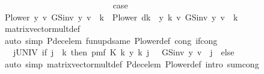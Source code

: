\begin{isabellebody}
\ \ \ \ \ \ \isamarkupfalse%
\isanewline
\ \ \ \ \ \ \ \ \isamarkupfalse%
\ {}\isanewline
\ \ \ \ \ \ \ \ \isamarkupfalse%
\ {\isacharquery}{\kern0pt}case\ \isanewline
\ \ \ \ \ \ \ \ \isamarkupfalse%
\ {\isacharminus}{\kern0pt}\isanewline
\ \ \ \ \ \ \ \ \ \ \isamarkupfalse%
\ {\isachardoublequoteopen}{\isacharparenleft}{\kern0pt}P{\isacharunderscore}{\kern0pt}lower\ y\ {\isacharasterisk}{\kern0pt}v\ GS{\isacharunderscore}{\kern0pt}inv\ y\ v{\isacharparenright}{\kern0pt}\ {\isachardollar}{\kern0pt}\ k\ {\isacharequal}{\kern0pt}\ {\isacharparenleft}{\kern0pt}P{\isacharunderscore}{\kern0pt}lower\ {\isacharparenleft}{\kern0pt}d{\isacharparenleft}{\kern0pt}k\ {\isacharcolon}{\kern0pt}{\isacharequal}{\kern0pt}\ y\ k{\isacharparenright}{\kern0pt}{\isacharparenright}{\kern0pt}\ {\isacharasterisk}{\kern0pt}v\ GS{\isacharunderscore}{\kern0pt}inv\ y\ v{\isacharparenright}{\kern0pt}\ {\isachardollar}{\kern0pt}\ k{\isachardoublequoteclose}\isanewline
\ \ \ \ \ \ \ \ \ \ \ \ \isamarkupfalse%
\ matrix{\isacharunderscore}{\kern0pt}vector{\isacharunderscore}{\kern0pt}mult{\isacharunderscore}{\kern0pt}def\isanewline
\ \ \ \ \ \ \ \ \ \ \ \ \isamarkupfalse%
\ {\isacharparenleft}{\kern0pt}auto\ simp{\isacharcolon}{\kern0pt}\ P{\isacharunderscore}{\kern0pt}dec{\isacharunderscore}{\kern0pt}elem\ fun{\isacharunderscore}{\kern0pt}upd{\isacharunderscore}{\kern0pt}same\ P{\isacharunderscore}{\kern0pt}lower{\isacharunderscore}{\kern0pt}def\ cong{\isacharcolon}{\kern0pt}\ if{\isacharunderscore}{\kern0pt}cong{\isacharparenright}{\kern0pt}\isanewline
\ \ \ \ \ \ \ \ \ \ \isamarkupfalse%
\ \isamarkupfalse%
\ {\isachardoublequoteopen}{\isasymdots}\ {\isacharequal}{\kern0pt}\ {\isacharparenleft}{\kern0pt}{\isasymSum}j{\isasymin}UNIV{\isachardot}{\kern0pt}\ {\isacharparenleft}{\kern0pt}if\ j\ {\isacharless}{\kern0pt}\ k\ then\ pmf\ {\isacharparenleft}{\kern0pt}K\ {\isacharparenleft}{\kern0pt}k{\isacharcomma}{\kern0pt}\ y\ k{\isacharparenright}{\kern0pt}{\isacharparenright}{\kern0pt}\ j\ \ {\isacharasterisk}{\kern0pt}\ GS{\isacharunderscore}{\kern0pt}inv\ y\ v\ {\isachardollar}{\kern0pt}\ j\ \ else\ {}{\isacharparenright}{\kern0pt}{\isacharparenright}{\kern0pt}{\isachardoublequoteclose}\isanewline
\ \ \ \ \ \ \ \ \ \ \ \ \isamarkupfalse%
\ {\isacharparenleft}{\kern0pt}auto\ simp{\isacharcolon}{\kern0pt}\ matrix{\isacharunderscore}{\kern0pt}vector{\isacharunderscore}{\kern0pt}mult{\isacharunderscore}{\kern0pt}def\ P{\isacharunderscore}{\kern0pt}dec{\isacharunderscore}{\kern0pt}elem\ P{\isacharunderscore}{\kern0pt}lower{\isacharunderscore}{\kern0pt}def\ intro{\isacharbang}{\kern0pt}{\isacharcolon}{\kern0pt}\ sum{\isachardot}{\kern0pt}cong{\isacharparenright}{\kern0pt}\isanewline

\end{isabellebody}
